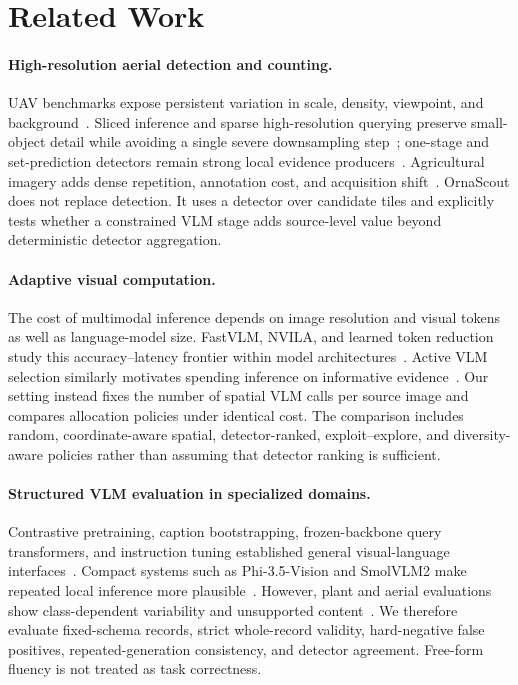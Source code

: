 \section{Related Work}
\paragraph{High-resolution aerial detection and counting.}
UAV benchmarks expose persistent variation in scale, density, viewpoint, and background~\cite{du2018uavdt,zhu2018visdrone}. Sliced inference and sparse high-resolution querying preserve small-object detail while avoiding a single severe downsampling step~\cite{akyon2022sahi,yang2022querydet}; one-stage and set-prediction detectors remain strong local evidence producers~\cite{redmon2016yolo,carion2020detr}. Agricultural imagery adds dense repetition, annotation cost, and acquisition shift~\cite{osco2021precision,celikkan2025weedsgalore}. OrnaScout does not replace detection. It uses a detector over candidate tiles and explicitly tests whether a constrained VLM stage adds source-level value beyond deterministic detector aggregation.

\paragraph{Adaptive visual computation.}
The cost of multimodal inference depends on image resolution and visual tokens as well as language-model size. FastVLM, NVILA, and learned token reduction study this accuracy--latency frontier within model architectures~\cite{vasu2025fastvlm,liu2025nvila,zhao2025token}. Active VLM selection similarly motivates spending inference on informative evidence~\cite{safaei2025activevlm}. Our setting instead fixes the number of spatial VLM calls per source image and compares allocation policies under identical cost. The comparison includes random, coordinate-aware spatial, detector-ranked, exploit--explore, and diversity-aware policies rather than assuming that detector ranking is sufficient.

\paragraph{Structured VLM evaluation in specialized domains.}
Contrastive pretraining, caption bootstrapping, frozen-backbone query transformers, and instruction tuning established general visual-language interfaces~\cite{radford2021clip,li2022blip,li2023blip2,dai2023instructblip}. Compact systems such as Phi-3.5-Vision and SmolVLM2 make repeated local inference more plausible~\cite{microsoft2024phi35vision,huggingface2025smolvlm2}. However, plant and aerial evaluations show class-dependent variability and unsupported content~\cite{arshad2025ageval,basak2025aerial,huang2025frisbee}. We therefore evaluate fixed-schema records, strict whole-record validity, hard-negative false positives, repeated-generation consistency, and detector agreement. Free-form fluency is not treated as task correctness.

